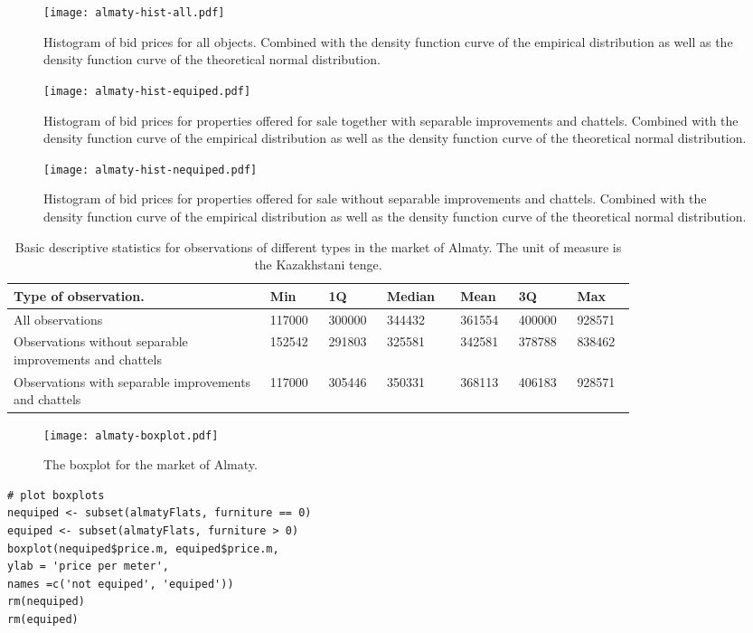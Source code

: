 \documentclass[]{scrreprt}
\begin{document}
%
\begin{figure}[htp]
	\centering
	\texttt{[image: almaty-hist-all.pdf]}
	\caption{Histogram of bid prices for all objects. Combined with the density function curve of the empirical distribution as well as the density function curve of the theoretical normal distribution.}
	\label{fig:almaty-hist-all-r}
\end{figure}
%
%
\begin{figure}[htp]
	\centering
	\texttt{[image: almaty-hist-equiped.pdf]}
	\caption{Histogram of bid prices for properties offered for sale together with separable improvements and chattels. Combined with the density function curve of the empirical distribution as well as the density function curve of the theoretical normal distribution.}
	\label{fig:almaty-hist-equiped-r}
\end{figure}
%
\begin{figure}[htp]
	\centering
	\texttt{[image: almaty-hist-nequiped.pdf]}
	\caption{Histogram of bid prices for properties offered for sale without separable improvements and chattels. Combined with the density function curve of the empirical distribution as well as the density function curve of the theoretical normal distribution.}
	\label{fig:almaty-hist-nequiped-r}
\end{figure}
%
\begin{table}[htp]
	\caption{Basic descriptive statistics for observations of different types in the market of Almaty. The unit of measure is the Kazakhstani tenge.}\label{tab:summaries-almaty-R}
	\centering
	\begin{tabularx}{\textwidth}{p{0.35\linewidth} p{0.07\linewidth} p{0.07\linewidth} p{0.1\linewidth} p{0.07\linewidth} p{0.07\linewidth} p{0.07\linewidth}}
		\hline
		Type of observation.&Min&1Q&Median&Mean&3Q&Max\\
		\hline
		All observations&117000&300000&344432&361554&400000&928571\\
		\hline
		Observations without separable improvements and chattels&152542&291803&325581&342581&378788&838462\\
		\hline
		Observations with separable improvements and chattels&117000&305446&350331&368113&406183&928571\\
		\hline
	\end{tabularx}
\end{table}
%
\begin{figure}[htp]
	\centering
	\texttt{[image: almaty-boxplot.pdf]}
	\caption{The boxplot for the market of Almaty.}
	\label{fig:almaty-boxplot-r}
\end{figure}
%
\begin{lstlisting}[float=htp, caption = Plotting boxplot diagram for the market of Almaty, firstnumber=1, label= lst:boxplot-R]
# plot boxplots
nequiped <- subset(almatyFlats, furniture == 0)
equiped <- subset(almatyFlats, furniture > 0)
boxplot(nequiped$price.m, equiped$price.m,
ylab = 'price per meter',
names =c('not equiped', 'equiped'))
rm(nequiped)
rm(equiped)
\end{lstlisting}
%
\end{document}
